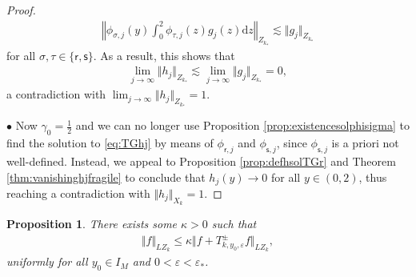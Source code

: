 \documentclass[11pt,reqno]{amsproc}
\newcommand{\bullpar}[1]{\vspace{.5em}\noindent $\bullet$ \normalfont {\bfseries #1.}}
\newtheorem{proposition}{Proposition}[section]
\theoremstyle{definition}
\numberwithin{equation}{section}
\newcommand{\sr}{{\mathsf{r}}}
\newcommand{\s}{{\mathsf{s}}}
\renewcommand{\d}{\mathrm{d}}
\newcommand{\ep}{\varepsilon}
\renewcommand{\P}{{\mathcal{P}}}
\begin{document}
\begin{proof}
\begin{align*}
\left\Vert \phi_{\sigma,j}(y) \int_0^2 \phi_{\tau,j}(z) g_j(z) \d z \right\Vert_{Z_{k_*}}\lesssim \Vert g_j \Vert_{Z_{k_*}}
\end{align*}
for all $\sigma,\tau\in \lbrace \sr, \s \rbrace$. As a result, this shows that
\begin{align*}
\lim_{j\rightarrow \infty}\Vert h_j \Vert_{Z_{k_*}} \lesssim \lim_{j\rightarrow \infty}\Vert g_j \Vert_{Z_{k_*}} = 0,
\end{align*}
a contradiction with $\lim_{j\rightarrow \infty}\Vert h_j \Vert_{Z_{k_*}} = 1$.

\bullpar{Case $\P(y_0)=0$} Now $\gamma_0=\frac12$ and we can no longer use Proposition \ref{prop:existencesolphisigma} to find the solution to \eqref{eq:TGhj} by means of $\phi_{\sr,j}$ and $\phi_{\s,j}$, since $\phi_{\s,j}$ is a priori not well-defined. Instead, we appeal to Proposition \ref{prop:defhsolTGr} and Theorem \ref{thm:vanishinghjfragile} to conclude that $h_j(y)\rightarrow 0$ for all $y\in(0,2)$, thus reaching a contradiction with $\Vert h_j \Vert_{X_k}=1$.
\end{proof} 

\begin{proposition}\label{prop:LAPLZk}
There exists some $\kappa>0$ such that 
\begin{align*}
\Vert  f \Vert_{LZ_k} \leq \kappa \Vert f + T_{k,y_0,\ep}^\pm f  \Vert_{LZ_k},
\end{align*}
uniformly for all $y_0\in I_M$ and $0<\ep<\ep_*$.
\end{proposition}
\end{document}
